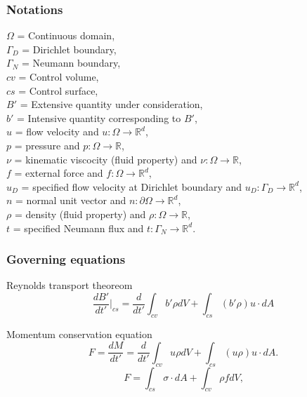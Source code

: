 \documentclass{beamer}
\begin{document}
\begin{frame}
\frametitle{Notations}
$\Omega$ = Continuous domain,\\
$\Gamma_D$ = Dirichlet boundary, \\
$\Gamma_N$ = Neumann boundary, \\
$cv$ = Control volume,\\
$cs$ = Control surface,\\
$B'$ = Extensive quantity under consideration,\\
$b'$ = Intensive quantity corresponding to $B'$,\\
$u$ = flow velocity and $u:\Omega \rightarrow \mathbb{R}^d$,\\
$p$ = pressure and $p:\Omega \rightarrow \mathbb{R}$,\\
$\nu$ = kinematic viscocity (fluid property) and $\nu:\Omega \rightarrow \mathbb{R}$,\\ 
$f$ = external force and $f:\Omega \rightarrow \mathbb{R}^d$,\\
$u_D$ = specified flow velocity at Dirichlet boundary and $u_D:\Gamma_D \rightarrow \mathbb{R}^d$,\\
$n$ = normal unit vector and $n:\partial \Omega \rightarrow \mathbb{R}^d$,\\
$\rho$ = density (fluid property) and $\rho:\Omega \rightarrow \mathbb{R}$,\\
$t$ = specified Neumann flux and $t:\Gamma_N \rightarrow \mathbb{R}^d$.\\
\end{frame}


\begin{frame}
\frametitle{Governing equations}

\begin{block}{Reynolds transport theoreom}
\begin{equation} \label{rtt} 
\frac{dB'}{dt'}|_{cs} = \frac{d}{dt'} \int_{cv} b' \rho dV + \int_{cs} (b' \rho) u\cdot dA 
\end{equation}
\end{block}

\begin{block}{Momentum conservation equation}
\begin{equation}\label{External force lhs}
F = \frac{dM}{dt'} = \frac{d}{dt'} \int_{cv} u \rho dV + \int_{cs} (u \rho) u\cdot dA \textrm{.}
\end{equation}
\begin{equation}\label{External force rhs}
F = \int_{cs} \sigma \cdot dA + \int_{cv} \rho f dV \textrm{,}
\end{equation}
\end{block}

\end{frame}
\end{document}

